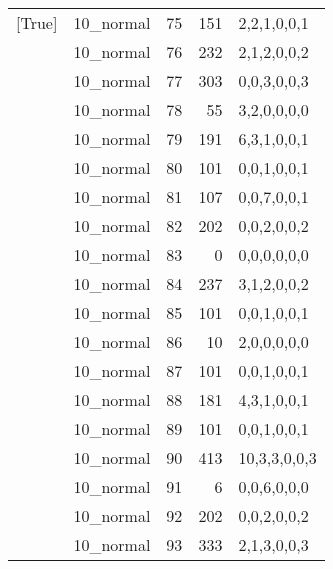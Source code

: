 \begin{tabular}{llrrl}
 [True]          & 10\_normal           &            75 &                   151 & 2,2,1,0,0,1   \\
 [True]          & 10\_normal           &            76 &                   232 & 2,1,2,0,0,2   \\
 [True]          & 10\_normal           &            77 &                   303 & 0,0,3,0,0,3   \\
 [True]          & 10\_normal           &            78 &                    55 & 3,2,0,0,0,0   \\
 [True]          & 10\_normal           &            79 &                   191 & 6,3,1,0,0,1   \\
 [True]          & 10\_normal           &            80 &                   101 & 0,0,1,0,0,1   \\
 [True]          & 10\_normal           &            81 &                   107 & 0,0,7,0,0,1   \\
 [True]          & 10\_normal           &            82 &                   202 & 0,0,2,0,0,2   \\
 [True]          & 10\_normal           &            83 &                     0 & 0,0,0,0,0,0   \\
 [True]          & 10\_normal           &            84 &                   237 & 3,1,2,0,0,2   \\
 [True]          & 10\_normal           &            85 &                   101 & 0,0,1,0,0,1   \\
 [True]          & 10\_normal           &            86 &                    10 & 2,0,0,0,0,0   \\
 [True]          & 10\_normal           &            87 &                   101 & 0,0,1,0,0,1   \\
 [True]          & 10\_normal           &            88 &                   181 & 4,3,1,0,0,1   \\
 [True]          & 10\_normal           &            89 &                   101 & 0,0,1,0,0,1   \\
 [True]          & 10\_normal           &            90 &                   413 & 10,3,3,0,0,3  \\
 [True]          & 10\_normal           &            91 &                     6 & 0,0,6,0,0,0   \\
 [True]          & 10\_normal           &            92 &                   202 & 0,0,2,0,0,2   \\
 [True]          & 10\_normal           &            93 &                   333 & 2,1,3,0,0,3   \\

\end{tabular}
